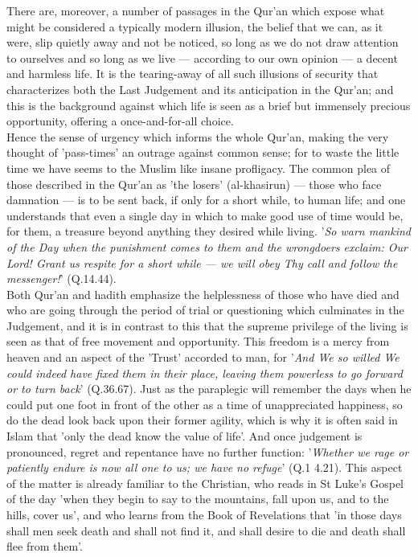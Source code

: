 \documentclass[10pt, twoside,openright]{book}
\begin{document}
There are, moreover, a number of passages in the Qur'an which expose what might be considered a 
typically modern illusion, the belief that we can, as it were, slip quietly away and not be noticed, 
so long as we do not draw attention to ourselves and so long as we live --- according to our own 
opinion --- a decent and harmless life. It is the tearing\hyp{}away of all such illusions of security that 
characterizes both the Last Judgement and its anticipation in the Qur'an; and this is the background 
against which life is seen as a brief but immensely precious opportunity, offering a once\hyp{}and\hyp{}for\hyp{}all 
choice. \\

Hence the sense of urgency which informs the whole Qur'an, making the very thought of 'pass-times' an 
outrage against common sense; for to waste the little time we have seems to the Muslim like insane 
profligacy. The common plea of those described in the Qur'an as 'the losers' (al\hyp{}khasirun) --- those 
who face damnation --- is to be sent back, if only for a short while, to human life; and one 
understands that even a single day in which to make good use of time would be, for them, a treasure 
beyond anything they desired while living. '\emph{So warn mankind of the Day when the punishment comes to them and the wrongdoers exclaim: Our Lord! Grant us respite for a short while --- we will obey Thy call and follow the messenger!}' (Q.14.44). \\

Both Qur'an and hadith emphasize the helplessness of those who have died and who are going through 
the period of trial or questioning which culminates in the Judgement, and it is in contrast to this 
that the supreme privilege of the living is seen as that of free movement and opportunity. This 
freedom is a mercy from heaven and an aspect of the 'Trust' accorded to man, for '\emph{And We so willed We could indeed have fixed them in their place, leaving them powerless to go forward or to turn 
back}' (Q.36.67). Just as the paraplegic will remember the days when he could put one foot in front of 
the other as a time of unappreciated happiness, so do the dead look back upon their former agility, 
which is why it is often said in Islam that 'only the dead know the value of life'. And once 
judgement is pronounced, regret and repentance have no further function: '\emph{Whether we rage or 
patiently endure is now all one to us; we have no refuge}' (Q.1 4.21). This aspect of the matter is 
already familiar to the Christian, who reads in St Luke's Gospel of the day 'when they begin to say 
to the mountains, fall upon us, and to the hills, cover us', and who learns from the Book of 
Revelations that 'in those days shall men seek death and shall not find it, and shall desire to die 
and death shall flee from them'. \\
\end{document}
